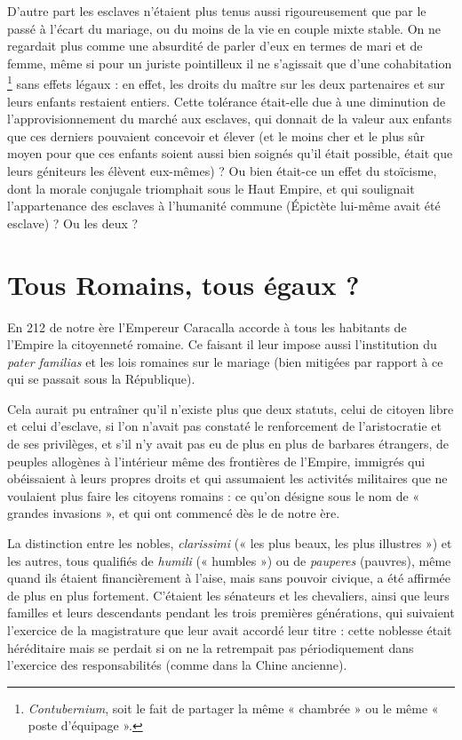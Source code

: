 D'autre part les esclaves n'étaient plus tenus aussi rigoureusement que par le passé à l'écart du mariage, ou du moins de la vie en couple mixte stable. On ne regardait plus comme une absurdité de parler d'eux en termes de mari et de femme, même si pour un juriste pointilleux il ne s'agissait que d'une cohabitation%
\footnote{\emph{Contubernium}, soit le fait de partager la même « chambrée » ou le même « poste d'équipage ».}
sans effets légaux : en effet, les droits du maître sur les deux partenaires et sur leurs enfants restaient entiers. Cette tolérance était-elle due à une diminution de l'approvisionnement du marché aux esclaves, qui donnait de la valeur aux enfants que ces derniers pouvaient concevoir et élever (et le moins cher et le plus sûr moyen pour que ces enfants soient aussi bien soignés qu'il était possible, était que leurs géniteurs les élèvent eux-mêmes) ? Ou bien était-ce un effet du stoïcisme, dont la morale conjugale triomphait sous le Haut Empire, et qui soulignait l'appartenance des esclaves à l'humanité commune ({Épictète} lui-même avait été esclave) ? Ou les deux ? 
 
 
\section{Tous Romains, tous égaux ?}

 En 212 de notre ère l'Empereur Caracalla accorde à tous les habitants de l'Empire la citoyenneté romaine. Ce faisant il leur impose aussi l'institution du \emph{pater familias} et les lois romaines sur le mariage (bien mitigées par rapport à ce qui se passait sous la République). 

 Cela aurait pu entraîner qu'il n'existe plus que deux statuts, celui de citoyen libre et celui d'esclave, si l'on n'avait pas constaté le renforcement de l'aristocratie et de ses privilèges, et s'il n'y avait pas eu de plus en plus de barbares étrangers, de peuples allogènes à l'intérieur même des frontières de l'Empire, immigrés qui obéissaient à leurs propres droits et qui assumaient les activités militaires que ne voulaient plus faire les citoyens romains : ce qu'on désigne sous le nom de « grandes invasions », et qui ont commencé dès le  de notre ère. 

 La distinction entre les nobles, {\emph{clarissimi}} (« les plus beaux, les plus illustres ») et les autres, tous qualifiés de {\emph{humili}} (« humbles ») ou de {\emph{pauperes}} (pauvres), même quand ils étaient financièrement à l'aise, mais sans pouvoir civique, a été affirmée de plus en plus fortement. C'étaient les sénateurs et les chevaliers, ainsi que leurs familles et leurs descendants pendant les trois premières générations, qui suivaient l'exercice de la magistrature que leur avait accordé leur titre : cette noblesse était héréditaire mais se perdait si on ne la retrempait pas périodiquement dans l'exercice des responsabilités (comme dans la Chine ancienne).

